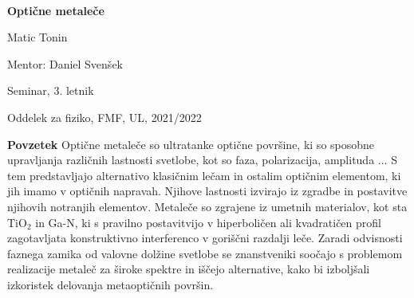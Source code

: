 \documentclass[12pt ]{article}
\begin{document}
 $~$ 
 
 \vspace{2cm}
 
 \centerline{\bf \huge  Optične metaleče}
 
 \vspace{1cm}
 
  \centerline{\huge  Matic Tonin}
  
   \vspace{1cm}
  
  \centerline{\large Mentor: Daniel Svenšek}
  
  \vspace{1cm}
  
  \centerline{\large Seminar, 3. letnik}
  
  \vspace{1cm}
  
  \centerline{\large Oddelek za fiziko, FMF, UL, 2021/2022}
  
  \vspace{6cm}
  
  \begin{minipage}[c]{0.9\hsize}
  {\bf Povzetek}
  Optične metaleče so ultratanke optične površine, ki so sposobne upravljanja različnih lastnosti svetlobe, kot so faza, polarizacija, amplituda ... S tem predstavljajo alternativo klasičnim lečam in ostalim optičnim elementom, ki jih imamo v optičnih napravah. Njihove lastnosti izvirajo iz zgradbe in postavitve njihovih notranjih elementov. Metaleče so zgrajene iz umetnih materialov, kot sta TiO$_2$ in Ga-N, ki s pravilno postavitvijo v hiperboličen ali kvadratičen profil zagotavljata konstruktivno interferenco v goriščni razdalji leče. Zaradi odvisnosti faznega zamika od valovne dolžine svetlobe se znanstveniki soočajo s problemom realizacije metaleč za široke spektre in iščejo alternative, kako bi izboljšali izkoristek delovanja metaoptičnih površin.
    \end{minipage}

 
 \newpage
  
  
\end{document}
